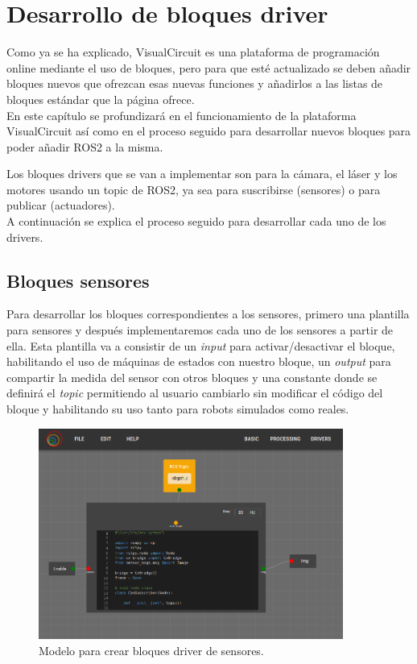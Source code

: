 \chapter{Desarrollo de bloques driver}
\label{cap:capitulo4}
Como ya se ha explicado, VisualCircuit es una plataforma de programación online mediante el uso de bloques, pero para que esté actualizado
se deben añadir bloques nuevos que ofrezcan esas nuevas funciones y añadirlos a las listas de bloques estándar que la página ofrece.\\
En este capítulo se profundizará en el funcionamiento de la plataforma VisualCircuit así como en el proceso seguido para desarrollar nuevos
bloques para poder añadir ROS2 a la misma.

Los bloques drivers que se van a implementar son para la cámara, el láser y los motores usando un topic de ROS2, ya sea para suscribirse (sensores)
o para publicar (actuadores).\\
A continuación se explica el proceso seguido para desarrollar cada uno de los drivers.

\section{Bloques sensores}
\label{sec:blocks_sensores}

Para desarrollar los bloques correspondientes a los sensores, primero  una plantilla para sensores y después implementaremos cada uno de
los sensores a partir de ella. Esta plantilla va a consistir de un \textit{input} para activar/desactivar el bloque, habilitando el uso de máquinas
de estados con nuestro bloque, un \textit{output} para compartir la medida del sensor con otros bloques y una constante donde se definirá
el \textit{topic} permitiendo al usuario cambiarlo sin modificar el código del bloque y habilitando su uso tanto para robots simulados como reales.\\
\begin{figure} [H]
  \begin{center}
      \includegraphics[width=10cm]{figs/c4/VC_driver_blocks.png}
  \end{center}
  \caption[Modelo bloque driver sensores]{Modelo para crear bloques driver de sensores.}
  \label{fig:VC_driver_model}
\end{figure}

